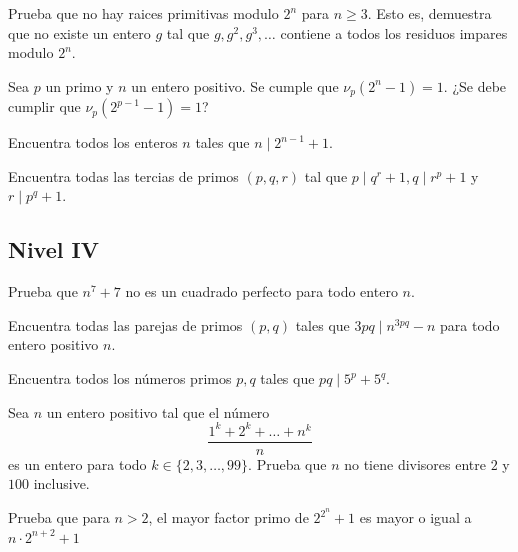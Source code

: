\documentclass[11pt]{scrartcl}
\newcommand{\thmdifficulty}{0}
\newcommand{\problemdiff}[1]{\renewcommand{\thmdifficulty}{#1}}
\begin{document}
\problemdiff{5}
\begin{problem}
    Prueba que no hay raices primitivas modulo $2^n$ para $n \geq 3$. Esto es, demuestra que no existe un entero $g$ tal que $g,g^2,g^3, \ldots$ contiene a todos los residuos impares modulo $2^n$.
\end{problem}


\problemdiff{5}
\begin{problem}
    Sea $p$ un primo y $n$ un entero positivo. Se cumple que $\nu_p (2^n-1)=1$. ¿Se debe cumplir que $\nu_p(2^{p-1}-1)=1$?
\end{problem}


\problemdiff{5}
\begin{problem}
    Encuentra todos los enteros $n$ tales que $n \mid 2^{n-1}+1$.
\end{problem}

\problemdiff{5.5}
\begin{problem}
    Encuentra todas las tercias de primos $(p,q,r)$ tal que $p\mid q^r+1, q\mid r^p+1$ y $r\mid p^q+1$.
\end{problem}

\subsection{Nivel IV}
\problemdiff{6}
\begin{problem}
    Prueba que $n^7+7$ no es un cuadrado perfecto para todo entero $n$.
\end{problem}

\problemdiff{6}
\begin{problem}
    Encuentra todas las parejas de primos $(p,q)$ tales que $3pq \mid n^{3pq}-n$ para todo entero positivo $n$. 
\end{problem}

\problemdiff{6}
\begin{problem}
    Encuentra todos los números primos $p,q$ tales que $pq \mid 5^p+5^q$.
\end{problem}

\problemdiff{7}
\begin{problem}
    Sea $n$ un entero positivo tal que el número 
    \[\frac{1^k+2^k+\ldots+n^k}{n}\]
    es un entero para todo $k\in \{2,3,\ldots, 99\}$. Prueba que $n$ no tiene divisores entre $2$ y $100$ inclusive. 
\end{problem}

\problemdiff{7}
\begin{problem}
    Prueba que para $n>2$, el mayor factor primo de $2^{2^n}+1$ es mayor o igual a $n\cdot 2^{n+2}+1$
\end{problem}
\end{document}
